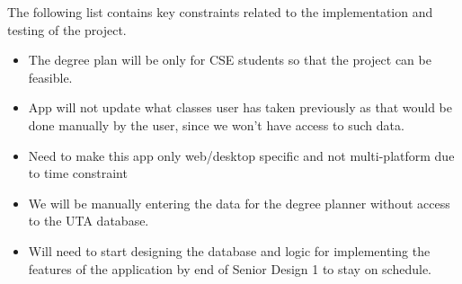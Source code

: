 The following list contains key constraints related to the implementation and testing of the project.

\begin{itemize}
  \item The degree plan will be only for CSE students so that the project can be feasible.
  \item App will not update what classes user has taken previously as that would be done manually by the user, since we won't have access to such data.
  \item Need to make this app only web/desktop specific and not multi-platform due to time constraint
  \item We will be manually entering the data for the degree planner without access to the UTA database.
  \item Will need to start designing the database and logic for implementing the features of the application by end of Senior Design 1 to stay on schedule.
\end{itemize}
